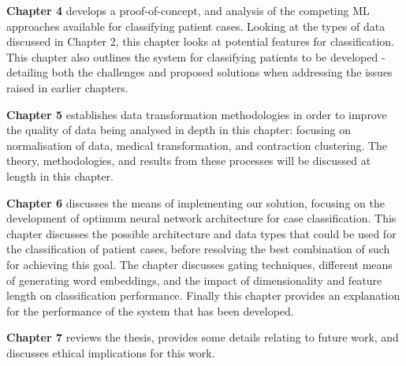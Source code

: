 
\textbf{Chapter 4}  develops a proof-of-concept, and analysis of the competing ML approaches available for classifying patient cases. Looking at the types of data discussed in Chapter 2, this chapter looks at potential features for classification. This chapter also outlines the system for classifying patients to be developed - detailing both the challenges and proposed solutions when addressing the issues raised in earlier chapters. 

\textbf{Chapter 5} establishes data transformation methodologies in order to improve the quality of data being analysed in depth in this chapter:  focusing on normalisation of data, medical transformation, and contraction clustering. The theory, methodologies, and results from these processes will be discussed at length in this chapter.

\textbf{Chapter 6} discusses the means of implementing our solution, focusing on the development of optimum neural network architecture for case classification. This chapter discusses the possible architecture and data types that could be used for the classification of patient cases, before resolving the best combination of such for achieving this goal. The chapter discusses gating techniques, different means of generating word embeddings, and the impact of dimensionality and feature length on classification performance. Finally this chapter provides an explanation for the performance of the system that has been developed.

\textbf{Chapter 7} reviews the thesis, provides some details relating to future work, and discusses ethical implications for this work.






